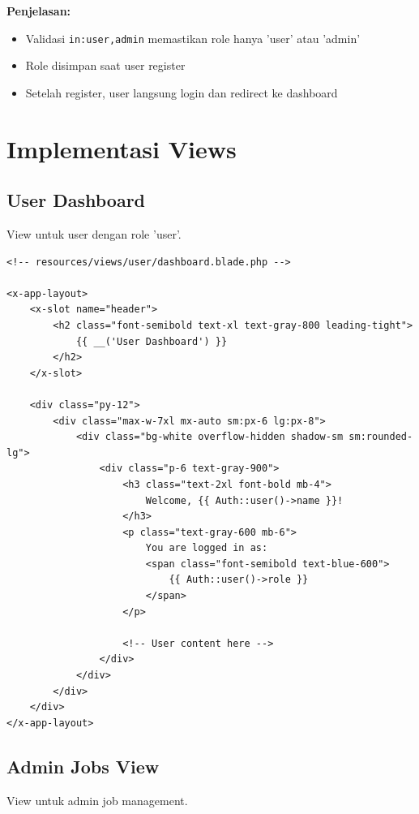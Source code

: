 \documentclass[a4paper,oneside,11pt]{book}
\begin{document}
\textbf{Penjelasan:}
\begin{itemize}
    \item Validasi \texttt{in:user,admin} memastikan role hanya 'user' atau 'admin'
    \item Role disimpan saat user register
    \item Setelah register, user langsung login dan redirect ke dashboard
\end{itemize}

\section{Implementasi Views}

\subsection{User Dashboard}
View untuk user dengan role 'user'.

\begin{lstlisting}[style=phpstyle]
<!-- resources/views/user/dashboard.blade.php -->

<x-app-layout>
    <x-slot name="header">
        <h2 class="font-semibold text-xl text-gray-800 leading-tight">
            {{ __('User Dashboard') }}
        </h2>
    </x-slot>

    <div class="py-12">
        <div class="max-w-7xl mx-auto sm:px-6 lg:px-8">
            <div class="bg-white overflow-hidden shadow-sm sm:rounded-lg">
                <div class="p-6 text-gray-900">
                    <h3 class="text-2xl font-bold mb-4">
                        Welcome, {{ Auth::user()->name }}!
                    </h3>
                    <p class="text-gray-600 mb-6">
                        You are logged in as: 
                        <span class="font-semibold text-blue-600">
                            {{ Auth::user()->role }}
                        </span>
                    </p>
                    
                    <!-- User content here -->
                </div>
            </div>
        </div>
    </div>
</x-app-layout>
\end{lstlisting}

\subsection{Admin Jobs View}
View untuk admin job management.
\end{document}

